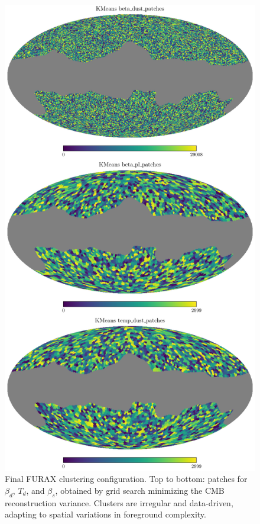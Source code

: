 \documentclass[%
 reprint,
bibnotes,
 amsmath,amssymb,
 aps,
floatfix, 
]{revtex4-2}
\begin{document}
\begin{figure}[H]
    \centering
    \includegraphics[width=\linewidth]{figures/kmeans_patch_layout.pdf} 
    \caption{
    Final FURAX clustering configuration. 
    Top to bottom: patches for \( \beta_d \), \( T_d \), and \( \beta_s \), obtained by grid search minimizing the CMB reconstruction variance.
    Clusters are irregular and data-driven, adapting to spatial variations in foreground complexity.
    }
    \label{fig:furax_patches}
\end{figure}
\end{document}
